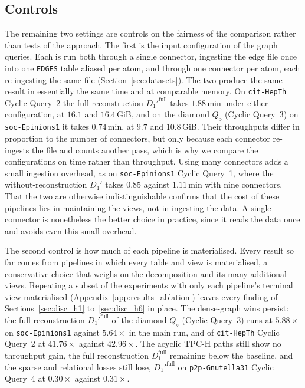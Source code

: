 \subsection{Controls}
\label{sec:controls}

The remaining two settings are controls on the fairness of the comparison rather than tests of the approach. The first is the input configuration of the graph queries. Each is run both through a single connector, ingesting the edge file once into one \texttt{EDGES} table aliased per atom, and through one connector per atom, each re-ingesting the same file (Section~\ref{sec:datasets}). The two produce the same result in essentially the same time and at comparable memory. On \texttt{cit-HepTh} Cyclic Query~2 the full reconstruction $D_1'^{\text{full}}$ takes $1.88$\,min under either configuration, at $16.1$ and $16.4$\,GiB, and on the diamond $Q_\diamond$ (Cyclic Query~3) on \texttt{soc-Epinions1} it takes $0.74$\,min, at $9.7$ and $10.8$\,GiB. Their throughputs differ in proportion to the number of connectors, but only because each connector re-ingests the file and counts another pass, which is why we compare the configurations on time rather than throughput. Using many connectors adds a small ingestion overhead, as on \texttt{soc-Epinions1} Cyclic Query~1, where the without-reconstruction $D_1'$ takes $0.85$ against $1.11$\,min with nine connectors. That the two are otherwise indistinguishable confirms that the cost of these pipelines lies in maintaining the views, not in ingesting the data. A single connector is nonetheless the better choice in practice, since it reads the data once and avoids even this small overhead.

The second control is how much of each pipeline is materialised. Every result so far comes from pipelines in which every table and view is materialised, a conservative choice that weighs on the decomposition and its many additional views. Repeating a subset of the experiments with only each pipeline's terminal view materialised (Appendix~\ref{app:results_ablation}) leaves every finding of Sections~\ref{sec:disc_h1} to~\ref{sec:disc_h6} in place. The dense-graph wins persist: the full reconstruction $D_1'^{\text{full}}$ of the diamond $Q_\diamond$ (Cyclic Query~3) runs at $5.88\times$ on \texttt{soc-Epinions1} against $5.64\times$ in the main run, and of \texttt{cit-HepTh} Cyclic Query~2 at $41.76\times$ against $42.96\times$. The acyclic TPC-H paths still show no throughput gain, the full reconstruction $D_1^{\text{full}}$ remaining below the baseline, and the sparse and relational losses still lose, $D_1'^{\text{full}}$ on \texttt{p2p-Gnutella31} Cyclic Query~4 at $0.30\times$ against $0.31\times$.

